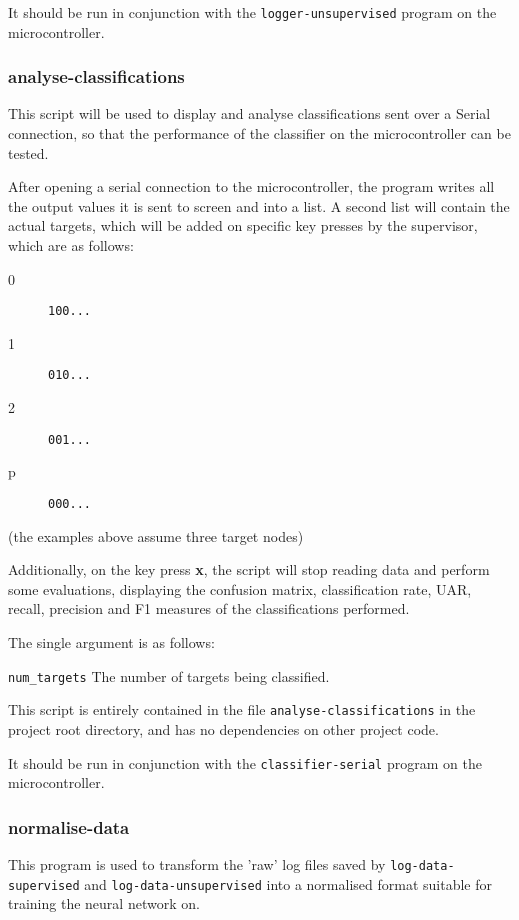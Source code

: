 \documentclass[a4paper]{article}
\begin{document}
It should be run in conjunction with the \lstinline{logger-unsupervised} program on the microcontroller.

\subsubsection{analyse-classifications}
\label{subsubsec:dc_csa_analyse}

This script will be used to display and analyse classifications sent over a Serial connection, so that the performance of the classifier on the microcontroller can be tested.

After opening a serial connection to the microcontroller, the program writes all the output values it is sent to screen and into a list. A second list will contain the actual targets, which will be added on specific key presses by the supervisor, which are as follows:

\begin{description}
\item[0] \lstinline|100...|
\item[1] \lstinline|010...|
\item[2] \lstinline|001...|
\item[p] \lstinline|000...|
\end{description}

(the examples above assume three target nodes)

Additionally, on the key press \textbf{x}, the script will stop reading data and perform some evaluations, displaying the confusion matrix, classification rate, UAR, recall, precision and F1 measures of the classifications performed.

The single argument is as follows:

\lstinline{num_targets} The number of targets being classified.

This script is entirely contained in the file \lstinline{analyse-classifications} in the project root directory, and has no dependencies on other project code.

It should be run in conjunction with the \lstinline{classifier-serial} program on the microcontroller.

\subsubsection{normalise-data}
\label{subsubsec:dc_csa_normalise}

This program is used to transform the 'raw' log files saved by \lstinline{log-data-supervised} and \lstinline{log-data-unsupervised} into a normalised format suitable for training the neural network on. 
\end{document}
